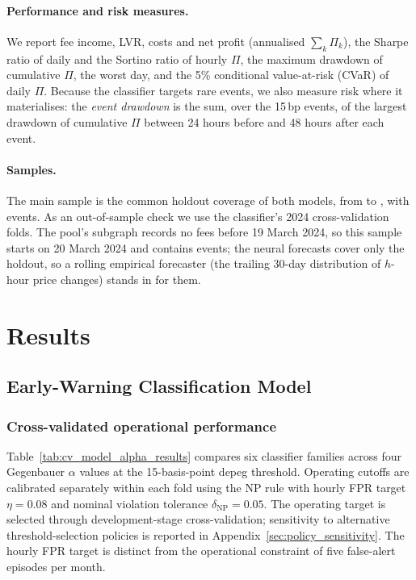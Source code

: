 \documentclass[a4paper,fleqn]{cas-sc}
\begin{document}
\paragraph{Performance and risk measures.} We report fee income, LVR, costs and net profit (annualised
$\sum_k\Pi_k$), the Sharpe ratio of daily and the Sortino ratio of hourly $\Pi$, the maximum drawdown of
cumulative $\Pi$, the worst day, and the 5\% conditional value-at-risk (CVaR) of daily $\Pi$. Because the
classifier targets rare events, we also measure risk where it materialises: the \emph{event drawdown} is
the sum, over the 15\,bp events, of the largest drawdown of cumulative $\Pi$ between 24 hours before and
48 hours after each event.

\paragraph{Samples.} The main sample is the common holdout coverage of both models, from \lpHoldoutStart{}
to \lpHoldoutEnd, with \lpNEvents{} events. As an out-of-sample check we use the classifier's 2024
cross-validation folds. The pool's subgraph records no fees before 19 March 2024, so this sample starts on
20 March 2024 and contains \lpYNEvents{} events; the neural forecasts cover only the holdout, so a rolling
empirical forecaster (the trailing 30-day distribution of $h$-hour price changes) stands in for them.

\section{Results}\label{sec:results}

\subsection{Early-Warning Classification Model}
\subsubsection{Cross-validated operational performance} \label{sec:cv_results}

Table~\ref{tab:cv_model_alpha_results} compares six classifier families across four Gegenbauer $\alpha$ values at the 15-basis-point depeg threshold. Operating cutoffs are calibrated separately within each fold using the NP rule with hourly FPR target $\eta=0.08$ and nominal violation tolerance $\delta_{\mathrm{NP}}=0.05$. The operating target is selected through development-stage cross-validation; sensitivity to alternative threshold-selection policies is reported in Appendix~\ref{sec:policy_sensitivity}. The hourly FPR target is distinct from the operational constraint of five false-alert episodes per month.
\end{document}
